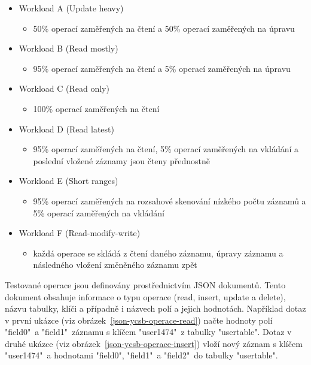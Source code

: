 \documentclass[czech,master,dept460,male,csharp,cpdeclaration]{diploma}
\begin{document}
	\begin{itemize} \label{lab-workloads}
		\item Workload A (Update heavy)
		\begin{itemize}
			\item 50\% operací zaměřených na čtení a 50\% operací zaměřených na úpravu
		\end{itemize}
		\item Workload B (Read mostly)
		\begin{itemize}
			\item 95\% operací zaměřených na čtení a 5\% operací zaměřených na úpravu
		\end{itemize}
		\item Workload C (Read only)
		\begin{itemize}
			\item 100\% operací zaměřených na čtení
		\end{itemize}
		\item Workload D (Read latest)
		\begin{itemize}
			\item 95\% operací zaměřených na čtení, 5\% operací zaměřených na vkládání a poslední vložené záznamy jsou čteny přednostně
		\end{itemize}
		\item Workload E (Short ranges)
		\begin{itemize}
			\item 95\% operací zaměřených na rozsahové skenování nízkého počtu záznamů a 5\% operací zaměřených na vkládání
		\end{itemize}
		\item Workload F (Read-modify-write)
		\begin{itemize}
			\item každá operace se skládá z čtení daného záznamu, úpravy záznamu a následného vložení změněného záznamu zpět
		\end{itemize}
	\end{itemize}
	
	Testované operace jsou definovány prostřednictvím JSON dokumentů. Tento dokument obsahuje informace o typu operace (read, insert, update a delete), názvu tabulky, klíči a případně i názvech polí a jejich hodnotách. Například dotaz v první ukázce (viz obrázek~\ref{json-ycsb-operace-read}) načte hodnoty polí "field0"~a "field1"~záznamu s klíčem "user1474"~z tabulky "usertable". Dotaz v druhé ukázce (viz obrázek~\ref{json-ycsb-operace-insert}) vloží nový záznam s klíčem "user1474"~a hodnotami "field0", "field1"~a "field2"~do tabulky "usertable".
	
\end{document}
